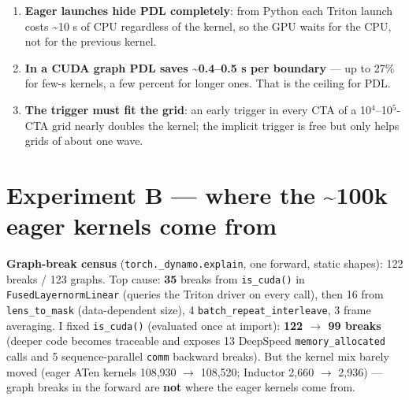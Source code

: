 \documentclass[10pt]{article}
\begin{document}
\begin{table}[H]\centering\small
{}
\end{table}

\begin{enumerate}
\item \textbf{Eager launches hide PDL completely}: from Python each Triton launch costs \textasciitilde{}10 \textmu{}s of CPU regardless of the kernel, so the GPU waits for the CPU, not for the previous kernel.
\item \textbf{In a CUDA graph PDL saves \textasciitilde{}0.4--0.5 \textmu{}s per boundary} --- up to 27\% for few-\textmu{}s kernels, a few percent for longer ones. That is the ceiling for PDL.
\item \textbf{The trigger must fit the grid}: an early trigger in every CTA of a 10$^4$--10$^5$-CTA grid nearly doubles the kernel; the implicit trigger is free but only helps grids of about one wave.
\end{enumerate}

\section{Experiment B --- where the \textasciitilde{}100k eager kernels come from}

\textbf{Graph-break census} (\texttt{torch.\_dynamo.explain}, one forward, static shapes): 122 breaks / 123 graphs. Top cause: \textbf{35} breaks from \texttt{is\_cuda()} in \texttt{FusedLayernormLinear} (queries the Triton driver on every call), then 16 from \texttt{lens\_to\_mask} (data-dependent size), 4 \texttt{batch\_repeat\_interleave}, 3 frame averaging. I fixed \texttt{is\_cuda()} (evaluated once at import): \textbf{122 $\rightarrow$ 99 breaks} (deeper code becomes traceable and exposes 13 DeepSpeed \texttt{memory\_allocated} calls and 5 sequence-parallel \texttt{comm} backward breaks). But the kernel mix barely moved (eager ATen kernels 108,930 $\rightarrow$ 108,520; Inductor 2,660 $\rightarrow$ 2,936) --- graph breaks in the forward are \textbf{not} where the eager kernels come from.
\end{document}
